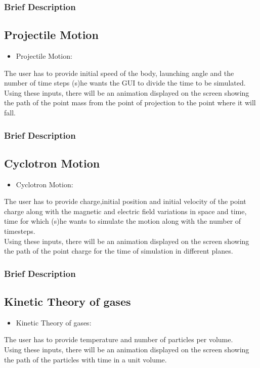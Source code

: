 \documentclass{beamer}
\begin{document}

\begin{frame}
\frametitle{Brief Description}
\subsection{Projectile Motion}
\begin{itemize}
\item {Projectile Motion:}
\end{itemize}
The user has to provide initial speed of the body, launching angle and the number of time steps (s)he wants the GUI to divide the time to be simulated. \\
Using these inputs, there will be an animation displayed on the screen showing the path of the point mass from the point of projection to the point where it will fall. 

\end{frame}

\begin{frame}
\frametitle{Brief Description}
\subsection{Cyclotron Motion}
\begin{itemize}
\item {Cyclotron Motion:}
\end{itemize}
The user has to provide charge,initial position and initial velocity of the point charge along with the magnetic and electric field variations in space and time, time for which (s)he wants to simulate the motion along with the number of timesteps.\\
Using these inputs, there will be an animation displayed on the screen showing the path of the point charge for the time of simulation in different planes.

\end{frame}

\begin{frame}
\frametitle{Brief Description}
\subsection{Kinetic Theory of gases}
\begin{itemize}
\item {Kinetic Theory of gases:}
\end{itemize}
The user has to provide temperature and number of particles per volume. \\
Using these inputs, there will be an animation displayed on the screen showing the path of the particles with time in a unit volume. 
\end{frame}
\end{document}
